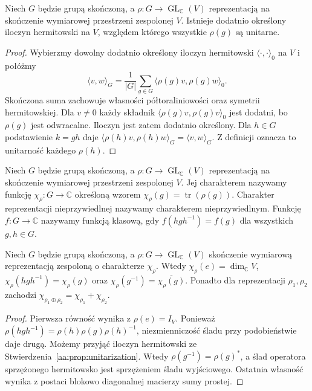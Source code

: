 \begin{stwierdzenie}
\label{aa:prop:unitarization}
Niech \(G\) będzie grupą skończoną, a
\(\rho:G\to\operatorname{GL}_{\mathbb C}(V)\)
reprezentacją na skończenie wymiarowej przestrzeni
zespolonej \(V\). Istnieje dodatnio określony
iloczyn hermitowski na \(V\), względem którego
wszystkie \(\rho(g)\) są unitarne.
\end{stwierdzenie}
\begin{proof}
Wybierzmy dowolny dodatnio określony iloczyn hermitowski
\(\langle\cdot,\cdot\rangle_0\) na \(V\) i połóżmy
\[
\langle v,w\rangle_G
=\frac1{|G|}\sum_{g\in G}
\langle\rho(g)v,\rho(g)w\rangle_0.
\]
Skończona suma zachowuje własności
półtoraliniowości oraz symetrii hermitowskiej.
Dla \(v\ne0\) każdy składnik
\(\langle\rho(g)v,\rho(g)v\rangle_0\) jest dodatni,
bo \(\rho(g)\) jest odwracalne. Iloczyn jest zatem
dodatnio określony. Dla \(h\in G\) podstawienie
\(k=gh\) daje
\(\langle\rho(h)v,\rho(h)w\rangle_G
=\langle v,w\rangle_G\).
Z definicji oznacza to unitarność każdego \(\rho(h)\).
\end{proof}

\begin{definicja}
\label{aa:def:character}
Niech \(G\) będzie grupą skończoną, a
\(\rho:G\to\operatorname{GL}_{\mathbb C}(V)\)
reprezentacją na skończenie wymiarowej przestrzeni
zespolonej \(V\). Jej charakterem nazywamy funkcję
\(\chi_\rho:G\to\mathbb C\) określoną wzorem
\(\chi_\rho(g)=\operatorname{tr}(\rho(g))\).
Charakter reprezentacji nieprzywiedlnej nazywamy
charakterem nieprzywiedlnym.
Funkcję \(f:G\to\mathbb C\) nazywamy funkcją klasową,
gdy \(f(hgh^{-1})=f(g)\) dla wszystkich \(g,h\in G\).
\end{definicja}

\begin{stwierdzenie}
\label{aa:prop:character-basics}
Niech \(G\) będzie grupą skończoną, a
\(\rho:G\to\operatorname{GL}_{\mathbb C}(V)\)
skończenie wymiarową reprezentacją zespoloną
o charakterze \(\chi_\rho\). Wtedy
\(\chi_\rho(e)=\dim_{\mathbb C}V\),
\(\chi_\rho(hgh^{-1})=\chi_\rho(g)\) oraz
\(\chi_\rho(g^{-1})=\overline{\chi_\rho(g)}\).
Ponadto dla reprezentacji \(\rho_1,\rho_2\)
zachodzi \(\chi_{\rho_1\oplus\rho_2}
=\chi_{\rho_1}+\chi_{\rho_2}\).
\end{stwierdzenie}
\begin{proof}
Pierwsza równość wynika z \(\rho(e)=I_V\).
Ponieważ
\(\rho(hgh^{-1})=\rho(h)\rho(g)\rho(h)^{-1}\),
niezmienniczość śladu przy podobieństwie daje drugą.
Możemy przyjąć iloczyn hermitowski ze
Stwierdzenia~\ref{aa:prop:unitarization}.
Wtedy \(\rho(g^{-1})=\rho(g)^*\), a ślad operatora
sprzężonego hermitowsko jest sprzężeniem śladu
wyjściowego. Ostatnia własność wynika z postaci
blokowo diagonalnej macierzy sumy prostej.
\end{proof}

